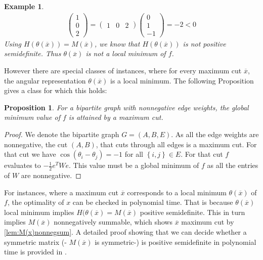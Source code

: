 \documentclass[12pt,a4paper]{article}
\theoremstyle{mythm}
\newtheorem{prop}[thm]{Proposition}
\newtheorem*{exa}{Example}
\begin{document}
\begin{exa}
\begin{align*}
\begin{pmatrix}
1 \\ 
0 \\
2
\end{pmatrix} 
= 
\begin{pmatrix}
1 & 0 & 2
\end{pmatrix} 
\begin{pmatrix}
0 \\
1 \\ 
-1
\end{pmatrix} 
= -2 < 0
\end{align*} 
Using $ H ( \theta ( \overline{ x } ) )= M ( \overline{ x } ) $, we know that $ H ( \theta ( \overline{ x } ) ) $ is not positive semidefinite. Thus $ \theta ( \overline{ x } )
$ is not a local minimum of $ f $.
\end{exa} 
However there are special classes of instances, where for every maximum cut $ \overline{ x }  $, the angular representation $ \theta ( \overline{ x } ) $ is a local minimum. 
The following Proposition gives a class for which this holds:
\begin{prop}
For a bipartite graph with nonnegative edge weights, the global minimum value of $ f $ is attained by a maximum cut.
\end{prop} 
\begin{proof}
We denote the bipartite graph $ G = \left( A,B,E \right)  $.
As all the edge weights are nonnegative, the cut $ ( A, B) $, that cuts through all edges is a maximum cut.
For that cut we have $ \cos( \theta _{ i } - \theta _j ) = -1 $ for all $ \left\{ i,j \right\} \in E $.
For that cut $ f $ evaluates to $ - \frac{ 1 }{ 2 } e ^T W e  $.
This value must be a global minimum of $ f $ as all the entries of $ W $ are nonnegative.
\end{proof}
For instances, where a maximum cut $ \overline{ x }  $ corresponds to a local minimum $ \theta ( \overline{ x } ) $ of $ f $, the optimality of $ x $ can be
checked in polynomial time. That is because $ \theta ( \overline{ x } ) $ local minimum implies $ H ( \theta ( \overline{ x } ) = M ( \overline{ x } ) $ positive
semidefinite. This in turn implies $ M ( \overline{ x } )  $ nonnegatively summable, which shows $ \overline{ x }  $ maximum cut by \ref{lem:M(x)nonnegsum}. 
A detailed proof showing that we can decide whether a symmetric matrix (- $ M ( \overline{ x } ) $ is symmetric-) is positive semidefinite in polynomial time is provided in
\cite[Theorem 16.8]{Korte2018}.
\end{document}
